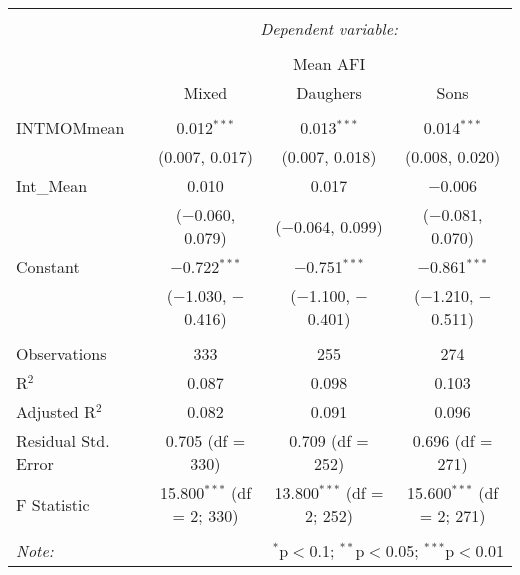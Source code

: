
\begingroup 
\small 
\begin{tabular}{@{\extracolsep{1pt}}lccc} 
\\[-1.8ex]\hline 
\hline \\[-1.8ex] 
 & \multicolumn{3}{c}{\textit{Dependent variable:}} \\ 
\cline{2-4} 
\\[-1.8ex] & \multicolumn{3}{c}{Mean AFI} \\ 
 & Mixed & Daughers & Sons \\ 
\hline \\[-1.8ex] 
 INTMOMmean & 0.012$^{***}$ & 0.013$^{***}$ & 0.014$^{***}$ \\ 
  & (0.007, 0.017) & (0.007, 0.018) & (0.008, 0.020) \\ 
  Int\_Mean & 0.010 & 0.017 & $-$0.006 \\ 
  & ($-$0.060, 0.079) & ($-$0.064, 0.099) & ($-$0.081, 0.070) \\ 
  Constant & $-$0.722$^{***}$ & $-$0.751$^{***}$ & $-$0.861$^{***}$ \\ 
  & ($-$1.030, $-$0.416) & ($-$1.100, $-$0.401) & ($-$1.210, $-$0.511) \\ 
 \hline \\[-1.8ex] 
Observations & 333 & 255 & 274 \\ 
R$^{2}$ & 0.087 & 0.098 & 0.103 \\ 
Adjusted R$^{2}$ & 0.082 & 0.091 & 0.096 \\ 
Residual Std. Error & 0.705 (df = 330) & 0.709 (df = 252) & 0.696 (df = 271) \\ 
F Statistic & 15.800$^{***}$ (df = 2; 330) & 13.800$^{***}$ (df = 2; 252) & 15.600$^{***}$ (df = 2; 271) \\ 
\hline 
\hline \\[-1.8ex] 
\textit{Note:}  & \multicolumn{3}{r}{$^{*}$p$<$0.1; $^{**}$p$<$0.05; $^{***}$p$<$0.01} \\ 
\end{tabular} 
\endgroup 
